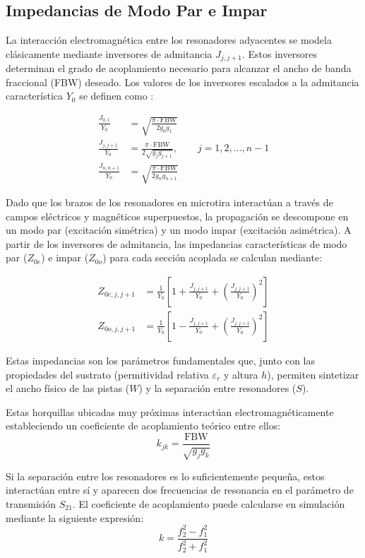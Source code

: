 \subsection{Impedancias de Modo Par e Impar}
La interacción electromagnética entre los resonadores adyacentes se modela clásicamente mediante inversores de admitancia $J_{j,j+1}$. Estos inversores determinan el grado de acoplamiento necesario para alcanzar el ancho de banda fraccional (FBW) deseado. Los valores de los inversores escalados a la admitancia característica $Y_0$ se definen como \cite{pozar}:

\begin{align}
\frac{J_{0,1}}{Y_0} &= \sqrt{\frac{\pi \cdot \mathrm{FBW}}{2 g_0 g_1}} \\
\frac{J_{j,j+1}}{Y_0} &= \frac{\pi \cdot \mathrm{FBW}}{2 \sqrt{g_j g_{j+1}}}, \qquad j = 1, 2, \ldots, n-1 \\
\frac{J_{n,n+1}}{Y_0} &= \sqrt{\frac{\pi \cdot \mathrm{FBW}}{2 g_n g_{n+1}}}
\end{align}

Dado que los brazos de los resonadores en microtira interactúan a través de campos eléctricos y magnéticos superpuestos, la propagación se descompone en un modo par (excitación simétrica) y un modo impar (excitación asimétrica). A partir de los inversores de admitancia, las impedancias características de modo par ($Z_{0e}$) e impar ($Z_{0o}$) para cada sección acoplada se calculan mediante:

\begin{align}
Z_{0e, j,j+1} &= \frac{1}{Y_0} \left[ 1 + \frac{J_{j,j+1}}{Y_0} + \left(\frac{J_{j,j+1}}{Y_0}\right)^2 \right] \\
Z_{0o, j,j+1} &= \frac{1}{Y_0} \left[ 1 - \frac{J_{j,j+1}}{Y_0} + \left(\frac{J_{j,j+1}}{Y_0}\right)^2 \right]
\end{align}

Estas impedancias son los parámetros fundamentales que, junto con las propiedades del sustrato (permitividad relativa $\varepsilon_r$ y altura $h$), permiten sintetizar el ancho físico de las pistas ($W$) y la separación entre resonadores ($S$).

Estas horquillas ubicadas muy próximas interactúan electromagnéticamente estableciendo un coeficiente de acoplamiento teórico entre ellos:
\begin{equation}
k_{jk} = \frac{\mathrm{FBW}}{\sqrt{g_j g_k}}
\end{equation}

Si la separación entre los resonadores es lo suficientemente pequeña, estos interactúan entre sí y aparecen dos frecuencias de resonancia en el parámetro de transmisión $S_{21}$. El coeficiente de acoplamiento puede calcularse en simulación mediante la siguiente expresión:
\begin{equation}
k = \frac{f_2^2 - f_1^2}{f_2^2 + f_1^2}
\end{equation}

